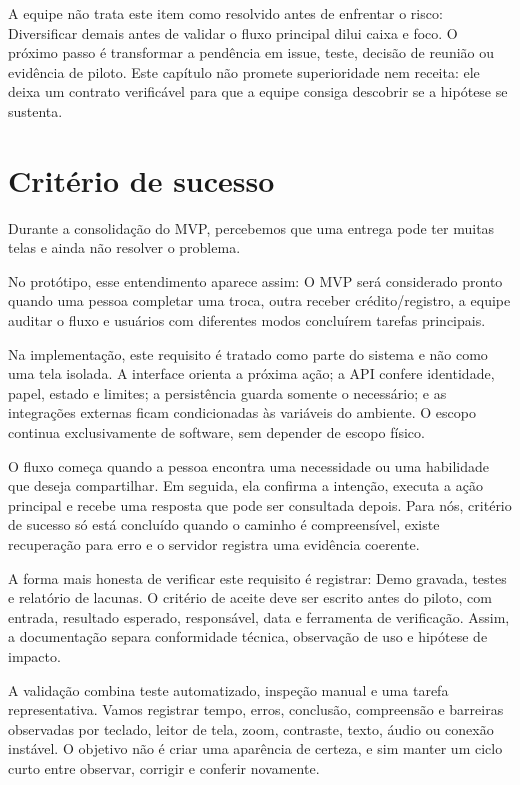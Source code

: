 \documentclass[12pt,oneside,a4paper,article]{abntex2}
\begin{document}
A equipe não trata este item como resolvido antes de enfrentar o risco: Diversificar demais antes de validar o fluxo principal dilui caixa e foco. O próximo passo é transformar a pendência em issue, teste, decisão de reunião ou evidência de piloto. Este capítulo não promete superioridade nem receita: ele deixa um contrato verificável para que a equipe consiga descobrir se a hipótese se sustenta.

\section{Critério de sucesso}
Durante a consolidação do MVP, percebemos que uma entrega pode ter muitas telas e ainda não resolver o problema.

No protótipo, esse entendimento aparece assim: O MVP será considerado pronto quando uma pessoa completar uma troca, outra receber crédito/registro, a equipe auditar o fluxo e usuários com diferentes modos concluírem tarefas principais.

Na implementação, este requisito é tratado como parte do sistema e não como uma tela isolada. A interface orienta a próxima ação; a API confere identidade, papel, estado e limites; a persistência guarda somente o necessário; e as integrações externas ficam condicionadas às variáveis do ambiente. O escopo continua exclusivamente de software, sem depender de escopo físico.

O fluxo começa quando a pessoa encontra uma necessidade ou uma habilidade que deseja compartilhar. Em seguida, ela confirma a intenção, executa a ação principal e recebe uma resposta que pode ser consultada depois. Para nós, critério de sucesso só está concluído quando o caminho é compreensível, existe recuperação para erro e o servidor registra uma evidência coerente.

A forma mais honesta de verificar este requisito é registrar: Demo gravada, testes e relatório de lacunas. O critério de aceite deve ser escrito antes do piloto, com entrada, resultado esperado, responsável, data e ferramenta de verificação. Assim, a documentação separa conformidade técnica, observação de uso e hipótese de impacto.

A validação combina teste automatizado, inspeção manual e uma tarefa representativa. Vamos registrar tempo, erros, conclusão, compreensão e barreiras observadas por teclado, leitor de tela, zoom, contraste, texto, áudio ou conexão instável. O objetivo não é criar uma aparência de certeza, e sim manter um ciclo curto entre observar, corrigir e conferir novamente.
\end{document}
